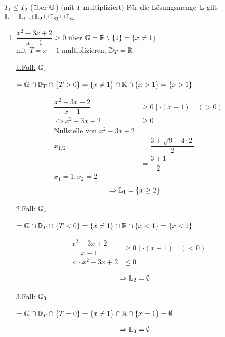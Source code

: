 \begin{itemize}
\begin{enumerate}
		$T_1\le T_2$ (über $\mathbb{G}$) (mit $T$ multipliziert)
		\clearpage
		Für die Lösungsmenge $\mathbb{L}$ gilt:\\
		$\mathbb{L} = \mathbb{L}_1 \cup \mathbb{L}_2 \cup \mathbb{L}_3 \cup \mathbb{L}_4$
		
		\Bsps
		\begin{enumerate}
			\item $\dfrac{x^2 -3x +2}{x-1} \ge 0$ über $\mathbb{G}=\mathbb{R}\setminus\{1\}=\{x\ne1\}$\\
			mit $T=x-1$ multiplizieren; $\mathbb{D}_T = \mathbb{R}$
			
			\ul{1.Fall:} $\mathbb{G}_1$\parbox[t]{5cm}{$=\mathbb{G}\cap \mathbb{D}_T\cap\{T>0\}\\=\{x\ne1\}\cap\mathbb{R}\cap \{x>1\} \\= \{x>1\}$}
			\begin{align*}
			\dfrac{x^2 -3x +2}{x-1} &\ge 0 \mid \cdot (x-1)\quad(>0)\\
			\Leftrightarrow x^2 -3x +2 &\ge 0\\
			\text{Nullstelle von }x^2 -3x +2\\
			x_{1/2} &= \dfrac{3\pm\sqrt{9-4\cdot2}}{2}\\
			&= \dfrac{3\pm1}{2}\\
			x_1 = 1, x_2 = 2
			\end{align*}
			\begin{align*}
			\Rightarrow\mathbb{L}_1 &=\{x\ge2\}
			\end{align*}
			
			\ul{2.Fall:} $\mathbb{G}_1$\parbox[t]{5cm}{$=\mathbb{G}\cap \mathbb{D}_T\cap\{T<0\}\\=\{x\ne1\}\cap\mathbb{R}\cap \{x<1\} \\= \{x<1\}$}
			\begin{align*}
			\dfrac{x^2 -3x +2}{x-1} &\ge 0 \mid \cdot (x-1)\quad(<0)\\
			\Leftrightarrow x^2 -3x +2 &\le 0\\
			\end{align*}
			\begin{align*}
			\Rightarrow\mathbb{L}_2 &=\emptyset
			\end{align*}
			
			\ul{3.Fall:} $\mathbb{G}_3$\parbox[t]{5cm}{$=\mathbb{G}\cap \mathbb{D}_T\cap\{T=0\}\\=\{x\ne1\}\cap\mathbb{R}\cap \{x=1\} \\= \emptyset$}
			\begin{align*}
			\Rightarrow\mathbb{L}_3 &=\emptyset
			\end{align*}
			

\end{enumerate}
\end{enumerate}
\end{itemize}
